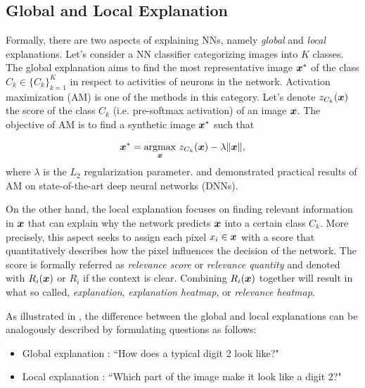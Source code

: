 \subsection{Global and Local Explanation}\label{sec:global_local_explanation}

Formally, there are two aspects of explaining NNs, namely \textit{global} and \textit{local} explanations. Let's consider a NN  classifier categorizing images into $K$ classes.  The global explanation aims to find the most representative image $\patvector{x}^*$ of the class $C_k \in \{C_k\}_{k=1}^K$ in respect to activities of neurons in the network. Activation maximization (AM) \citep{ ErhanUnderstandingRepresentationsLearned2010,SimonyanDeepConvolutionalNetworks2013} is one of the methods in this category. Let's denote $z_{C_k}(\boldsymbol{x})$  the score of the class $C_k$ (i.e. pre-softmax activation) of an image $\boldsymbol{x}$. The objective of AM is to find a synthetic image $\boldsymbol{x}^*$ such that  

\begin{align*}
\patvector{x}^*  = \patarg{max}{\patvector{x}} z_{C_k}(\x) - \lambda \|\x\|,
\end{align*}
where $\lambda$ is the $L_2$ regularization parameter. \citet{SimonyanDeepConvolutionalNetworks2013} and \citet{NguyenSynthesizingpreferredinputs2016a} demonstrated practical results of AM on state-of-the-art deep neural networks (DNNs).

On the other hand, the local explanation focuses on finding relevant information in $\patvector{x}$ that can explain why the network predicts $\boldsymbol{x}$ into a certain class $C_k$.  More precisely, this aspect seeks to assign each pixel $x_i \in \patvector{x}$ with a score that quantitatively describes how the pixel influences the decision of the network. The score is formally referred as \textit{relevance score} or \textit{relevance quantity} and denoted with $R_i(\boldsymbol{x})$ or $R_i$ if the context is clear. Combining $R_i(\boldsymbol{x})$ together will result in what so called, \textit{explanation}, \textit{explanation heatmap}, or \textit{relevance heatmap}.

As illustrated in \addfigure{\ref{fig:comparision_between_global_and_local_analysis}}, the difference between the global and local explanations can be analogously described by formulating questions as follows:
\begin{itemize}
	\item Global explanation : ``How does a typical digit 2 look like?"
    \item Local explanation : ``Which part of the image make it look like a digit 2?" 
\end{itemize}

